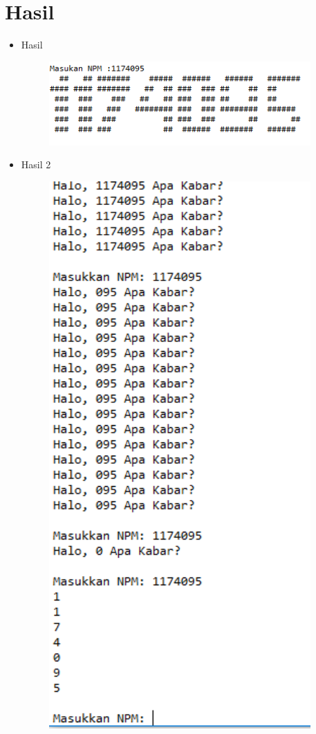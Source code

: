 \section{Hasil}
\begin{itemize}
	\item Hasil
	\begin{figure}[H]
		\includegraphics[width=10cm]{figures/dzihan/hasil.png}
		\centering
	\end{figure}
	\item Hasil 2
	\begin{figure}[H]
		\includegraphics[width=10cm]{figures/dzihan/2f.png}

\end{figure}
\end{itemize}
